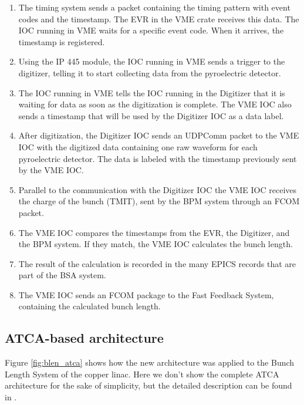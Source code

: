 \documentclass[letter,
        biblatex,   %
        keeplastbox,  %
        ]{jacow}
\begin{document}
\begin{enumerate}
  \item The timing system sends a packet containing the timing pattern with event codes and the timestamp. The EVR in the VME crate receives this data. The IOC running in VME waits for a specific event code. When it arrives, the timestamp is registered.
  \item Using the IP 445 module, the IOC running in VME sends a trigger to the digitizer, telling it to start collecting data from the pyroelectric detector.
  \item The IOC running in VME tells the IOC running in the Digitizer that it is waiting for data as soon as the digitization is complete. The VME IOC also sends a timestamp that will be used by the Digitizer IOC as a data label.
  \item After digitization, the Digitizer IOC sends an UDPComm packet to the VME IOC with the digitized data containing one raw waveform for each pyroelectric detector. The data is labeled with the timestamp previously sent by the VME IOC. 
  \item Parallel to the communication with the Digitizer IOC the VME IOC receives the charge of the bunch (TMIT), sent by the BPM system through an FCOM packet.
  \item The VME IOC compares the timestamps from the EVR, the Digitizer, and the BPM system. If they match, the VME IOC calculates the bunch length.
  \item The result of the calculation is recorded in the many EPICS records that are part of the BSA system.
  \item The VME IOC sends an FCOM package to the Fast Feedback System, containing the calculated bunch length.
\end{enumerate}

\subsection{ATCA-based architecture}
Figure \ref{fig:blen_atca} shows how the new architecture was applied to the Bunch Length System of the copper linac. Here we don't show the complete ATCA architecture for the sake of simplicity, but the detailed description can be found in \cite{ryan-2016, atca-bpm-2017}.
\end{document}

